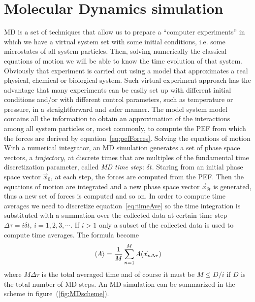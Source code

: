 \section{Molecular Dynamics simulation}
\label{sec:MD}
\acf{MD} is a set of techniques that allow us to prepare a ``computer experiments'' in which we have a virtual system set with some initial conditions, i.e. some microstates of all system particles. Then, solving numerically the classical equations of motion we will be able to know the time evolution of that system. Obviously that experiment is carried out using a model that approximates a real physical, chemical or biological system. Such virtual experiment approach has the advantage that many experiments can be easily set up with different initial conditions and/or with different control parameters, such as temperature or pressure, in a straightforward and safer manner.
The model system model contains all the information to obtain an approximation of the interactions among all system particles or, most commonly, to compute the \ac{PEF} from which the forces are derived by equation~\eqref{eq:pefForces}. Solving the equations of motion With a numerical integrator, an \ac{MD} simulation generates a set of phase space vectors, a \textit{trajectory}, at discrete times that are multiples of the fundamental time discretization parameter, called \textit{MD time step}: $\delta t$. Staring from an initial phase space vector $\vec x_0$, at each step, the forces are computed from the \ac{PEF}. Then the equations of motion are
integrated and a new phase space vector $\vec x_{\delta t}$ is generated, thus a new set of forces is computed and so on. In order to compute time averages we need to discretize equation~\eqref{eq:timeAve} so the time integration is substituted with a summation over the collected data at certain time step $\Delta \tau = i \delta t$, $i=1,2,3,\cdots$. If $i > 1$ only a subset of the collected data is used to compute time averages. The formula become
\begin{equation}
	\left \langle A \right \rangle = \frac{1}{M}\sum_{n=1}^M A(\vec x_{n\Delta \tau})
	\label{eq:MDTimeAve}
\end{equation}
where $M\Delta \tau$ is the total averaged time and of course it must be $M \le D/i$ if $D$ is the total number of \ac{MD} steps. An \ac{MD} simulation can be summarized in the scheme in figure~(\ref{fig:MDscheme}).
